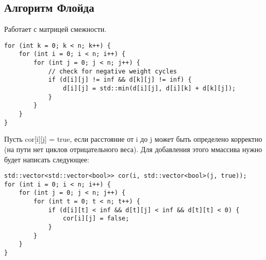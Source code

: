 \documentclass[12pt, a4paper]{article}
\begin{document}
    \subsection*{Алгоритм Флойда}
    Работает с матрицей смежности.
    \begin{lstlisting}
for (int k = 0; k < n; k++) {
    for (int i = 0; i < n; i++) {
        for (int j = 0; j < n; j++) {
            // check for negative weight cycles
            if (d[i][j] != inf && d[k][j] != inf) {
                d[i][j] = std::min(d[i][j], d[i][k] + d[k][j]);
            }
        }
    }
}
    \end{lstlisting}
    Пусть cor[i][j] = true, если расстояние от i до j может быть определено корректно (на пути нет циклов отрицательного веса). Для добавления этого ммассива нужно будет написать следующее:
    \begin{lstlisting}
std::vector<std::vector<bool>> cor(i, std::vector<bool>(j, true));
for (int i = 0; i < n; i++) {
    for (int j = 0; j < n; j++) {
        for (int t = 0; t < n; t++) {
            if (d[i][t] < inf && d[t][j] < inf && d[t][t] < 0) {
                cor[i][j] = false;
            }
        }
    }
}
    \end{lstlisting}\newpage
\end{document}
